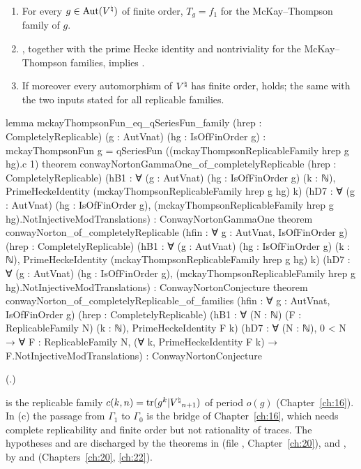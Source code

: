 \begin{theorem}\label{ch19:thm:cnconsequence}
\begin{enumerate}[label=(\alph*)]
\item For every $g\in\operatorname{Aut}({V^{\natural}})$ of finite order, $T_g=f_1$ for the McKay--Thompson family of $g$.
\item {}, together with the prime Hecke identity and nontriviality for the McKay--Thompson families, implies
  .
\item If moreover every automorphism of ${V^{\natural}}$ has finite order,  holds; the same with the two inputs
  stated for all replicable families.
\end{enumerate}
\end{theorem}
\begin{leancode}
lemma mckayThompsonFun_eq_qSeriesFun_family (hrep : CompletelyReplicable) (g : AutVnat)
    (hg : IsOfFinOrder g) :
    mckayThompsonFun g = qSeriesFun ((mckayThompsonReplicableFamily hrep g hg).c 1)
theorem conwayNortonGammaOne_of_completelyReplicable (hrep : CompletelyReplicable)
    (hB1 : ∀ (g : AutVnat) (hg : IsOfFinOrder g) (k : ℕ),
      PrimeHeckeIdentity (mckayThompsonReplicableFamily hrep g hg) k)
    (hD7 : ∀ (g : AutVnat) (hg : IsOfFinOrder g),
      (mckayThompsonReplicableFamily hrep g hg).NotInjectiveModTranslations) :
    ConwayNortonGammaOne
theorem conwayNorton_of_completelyReplicable (hfin : ∀ g : AutVnat, IsOfFinOrder g)
    (hrep : CompletelyReplicable)
    (hB1 : ∀ (g : AutVnat) (hg : IsOfFinOrder g) (k : ℕ),
      PrimeHeckeIdentity (mckayThompsonReplicableFamily hrep g hg) k)
    (hD7 : ∀ (g : AutVnat) (hg : IsOfFinOrder g),
      (mckayThompsonReplicableFamily hrep g hg).NotInjectiveModTranslations) :
    ConwayNortonConjecture
theorem conwayNorton_of_completelyReplicable_of_families (hfin : ∀ g : AutVnat, IsOfFinOrder g)
    (hrep : CompletelyReplicable)
    (hB1 : ∀ (N : ℕ) (F : ReplicableFamily N) (k : ℕ), PrimeHeckeIdentity F k)
    (hD7 : ∀ (N : ℕ), 0 < N → ∀ F : ReplicableFamily N, (∀ k, PrimeHeckeIdentity F k) →
      F.NotInjectiveModTranslations) :
    ConwayNortonConjecture
\end{leancode}
(.)
\begin{dictionary}
 is the replicable family $c(k,n)=\operatorname{tr}(g^k|{V^{\natural}}_{n+1})$ of period $o(g)$ (Chapter~\ref{ch:16}).
In (c) the passage from $\Gamma_1$ to $\Gamma_0$ is the bridge  of Chapter~\ref{ch:16}, which needs complete
replicability and finite order but not rationality of traces.  The hypotheses  and  are discharged by the theorems in
 (file , Chapter~\ref{ch:20}),
and ,  by  and  (Chapters~\ref{ch:20}, \ref{ch:22}).
\end{dictionary}
